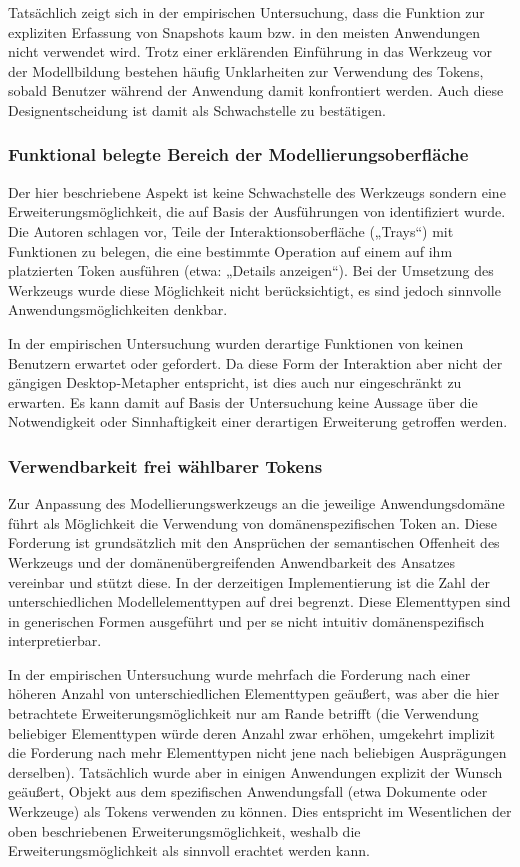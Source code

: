 Tatsächlich zeigt sich in der empirischen Untersuchung, dass die Funktion zur expliziten Erfassung von Snapshots kaum bzw. in den meisten Anwendungen nicht verwendet wird. Trotz einer erklärenden Einführung in das Werkzeug vor der Modellbildung bestehen häufig Unklarheiten zur Verwendung des Tokens, sobald Benutzer während der Anwendung damit konfrontiert werden. Auch diese Designentscheidung ist damit als Schwachstelle zu bestätigen. 

\subsubsection{Funktional belegte Bereich der Modellierungsoberfläche}

Der hier beschriebene Aspekt ist keine Schwachstelle des Werkzeugs sondern eine Erweiterungsmöglichkeit, die auf Basis der Ausführungen von \citep{Ishii97} identifiziert wurde. Die Autoren schlagen vor, Teile der Interaktionsoberfläche („Trays“) mit Funktionen zu belegen, die eine bestimmte Operation auf einem auf ihm platzierten Token ausführen (etwa: „Details anzeigen“). Bei der Umsetzung des Werkzeugs wurde diese Möglichkeit nicht berücksichtigt, es sind jedoch sinnvolle Anwendungsmöglichkeiten denkbar.

In der empirischen Untersuchung wurden derartige Funktionen von keinen Benutzern erwartet oder gefordert. Da diese Form der Interaktion aber nicht der gängigen Desktop-Metapher entspricht, ist dies auch nur eingeschränkt zu erwarten. Es kann damit auf Basis der Untersuchung keine Aussage über die Notwendigkeit oder Sinnhaftigkeit einer derartigen Erweiterung getroffen werden.

\subsubsection{Verwendbarkeit frei wählbarer Tokens}

Zur Anpassung des Modellierungswerkzeugs an die jeweilige Anwendungsdomäne führt \citep{Holmquist99} als Möglichkeit die Verwendung von domänenspezifischen Token an. Diese Forderung ist grundsätzlich mit den Ansprüchen der semantischen Offenheit des Werkzeugs und der domänenübergreifenden Anwendbarkeit des Ansatzes vereinbar und stützt diese. In der derzeitigen Implementierung ist die Zahl der unterschiedlichen Modellelementtypen auf drei begrenzt. Diese Elementtypen sind in generischen Formen ausgeführt und per se nicht intuitiv domänenspezifisch interpretierbar.

In der empirischen Untersuchung wurde mehrfach die Forderung nach einer höheren Anzahl von unterschiedlichen Elementtypen geäußert, was aber die hier betrachtete Erweiterungsmöglichkeit nur am Rande betrifft (die Verwendung beliebiger Elementtypen würde deren Anzahl zwar erhöhen, umgekehrt implizit die Forderung nach mehr Elementtypen nicht jene nach beliebigen Ausprägungen derselben). Tatsächlich wurde aber in einigen Anwendungen explizit der Wunsch geäußert, Objekt aus dem spezifischen Anwendungsfall (etwa Dokumente oder Werkzeuge) als Tokens verwenden zu können. Dies entspricht im Wesentlichen der oben beschriebenen Erweiterungsmöglichkeit, weshalb die Erweiterungsmöglichkeit als sinnvoll erachtet werden kann. 

